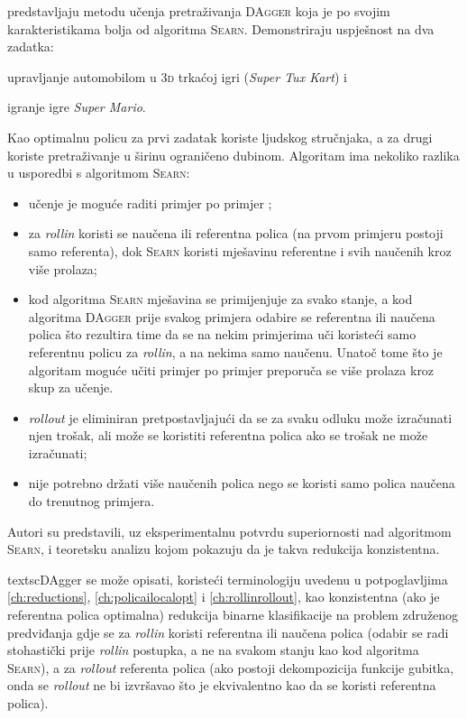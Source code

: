 \citet{ross2011reduction} predstavljaju metodu učenja pretraživanja
\textsc{DAgger}  koja je po svojim
karakteristikama bolja od algoritma \textsc{Searn}. Demonstriraju uspješnost na
dva zadatka:
\begin{inlinelist}
  \item upravljanje automobilom u \textsc{3d} trkaćoj igri (\textit{Super Tux
  Kart}) i
  \item igranje igre \textit{Super Mario}.
\end{inlinelist}
Kao optimalnu policu za prvi zadatak koriste ljudskog stručnjaka, a za drugi
koriste pretraživanje u širinu  ograničeno
dubinom. Algoritam ima nekoliko razlika u usporedbi s algoritmom \textsc{Searn}:
\begin{itemize}
  \item učenje je moguće raditi primjer po primjer ;
  \item za \textit{rollin} koristi se naučena ili referentna polica (na prvom
  primjeru postoji samo referenta), dok \textsc{Searn} koristi mješavinu
  referentne i svih naučenih kroz više prolaza;
  \item kod algoritma \textsc{Searn} mješavina se primijenjuje za svako stanje,
  a kod algoritma \textsc{DAgger} prije svakog primjera odabire se referentna
  ili naučena polica što rezultira time da se na nekim primjerima uči koristeći
  samo referentnu policu za \textit{rollin}, a na nekima samo naučenu. Unatoč
  tome što je algoritam moguće učiti primjer po primjer preporuča se više
  prolaza kroz skup za učenje.
  \item \textit{rollout} je eliminiran pretpostavljajući da se za svaku odluku
  može izračunati njen trošak, ali može se koristiti referentna polica ako se
  trošak ne može izračunati;
  \item nije potrebno držati više naučenih polica nego se koristi samo polica
  naučena do trenutnog primjera.
\end{itemize}
Autori su predstavili, uz eksperimentalnu potvrdu superiornosti nad algoritmom
\textsc{Searn}, i teoretsku analizu kojom pokazuju da je takva redukcija
konzistentna.

textsc{DAgger} se može opisati, koristeći terminologiju uvedenu u potpoglavljima
\ref{ch:reductions}, \ref{ch:policailocalopt} i \ref{ch:rollinrollout}, kao
konzistentna (ako je referentna polica optimalna) redukcija binarne
klasifikacije na problem združenog predviđanja gdje se za \textit{rollin}
koristi referentna ili naučena polica (odabir se radi stohastički prije
\textit{rollin} postupka, a ne na svakom stanju kao kod algoritma
\textsc{Searn}), a za \textit{rollout} referenta polica (ako postoji
dekompozicija funkcije gubitka, onda se \textit{rollout} ne bi izvršavao što je
ekvivalentno kao da se koristi referentna polica).
